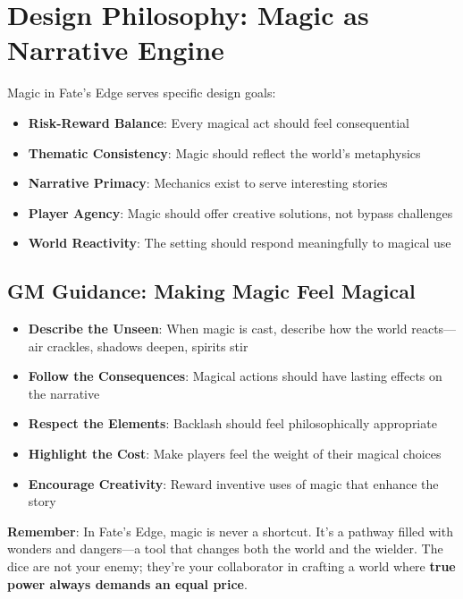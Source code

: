 \section*{Design Philosophy: Magic as Narrative Engine}

Magic in Fate's Edge serves specific design goals:

\begin{itemize}
    \item \textbf{Risk-Reward Balance}: Every magical act should feel consequential
    \item \textbf{Thematic Consistency}: Magic should reflect the world's metaphysics
    \item \textbf{Narrative Primacy}: Mechanics exist to serve interesting stories
    \item \textbf{Player Agency}: Magic should offer creative solutions, not bypass challenges
    \item \textbf{World Reactivity}: The setting should respond meaningfully to magical use
\end{itemize}

\subsection*{GM Guidance: Making Magic Feel Magical}

\begin{itemize}
    \item \textbf{Describe the Unseen}: When magic is cast, describe how the world reacts—air crackles, shadows deepen, spirits stir
    \item \textbf{Follow the Consequences}: Magical actions should have lasting effects on the narrative
    \item \textbf{Respect the Elements}: Backlash should feel philosophically appropriate
    \item \textbf{Highlight the Cost}: Make players feel the weight of their magical choices
    \item \textbf{Encourage Creativity}: Reward inventive uses of magic that enhance the story
\end{itemize}

\textbf{Remember}: In Fate's Edge, magic is never a shortcut. It's a pathway filled with wonders and dangers—a tool that changes both the world and the wielder. The dice are not your enemy; they're your collaborator in crafting a world where \textbf{true power always demands an equal price}.

